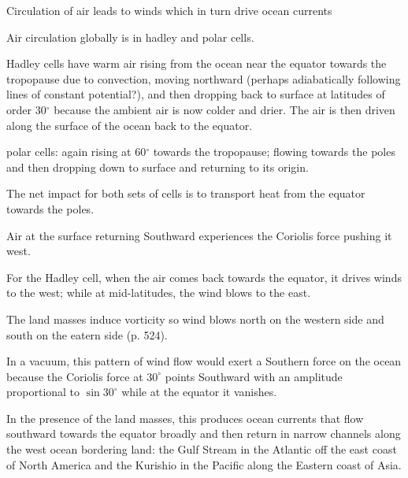 \documentclass[11pt]{book}
\begin{document}
\bei
\item Circulation of air leads to winds which in turn drive ocean currents
\item Air circulation globally is in hadley and polar cells. 
\item Hadley cells have warm air rising from the ocean near the equator towards the tropopause due to convection, moving northward (perhaps adiabatically following lines of constant potential?), and then dropping back to surface at latitudes of order 30$^\circ$ because the ambient air is now colder and drier. 
The air is then driven along the surface of the ocean back to the equator.
\item polar cells: again rising at 60$^\circ$ towards the tropopause; flowing towards the poles and then dropping down to surface and returning to its origin.
\item The net impact for both sets of cells is to transport heat from the equator towards the poles.
\item Air at the surface returning Southward experiences the Coriolis force pushing it west.
\item For the Hadley cell, when the air comes back towards the equator, it drives winds to the west; while at mid-latitudes, the wind blows to the east.
\item The land masses induce vorticity so wind blows north on the western side and south on the eatern side (p. 524). 
\item In a vacuum, this pattern of wind flow would exert a Southern force on the ocean because the Coriolis force at $30^\circ$ points Southward with an amplitude proportional to $\sin 30^\circ$ while at the equator it vanishes. 
\item In the presence of the land masses, this produces ocean currents that flow southward towards the equator broadly and then return in narrow channels along the west ocean bordering land: the Gulf Stream in the Atlantic off the east coast of North America and the Kurishio in the Pacific along the Eastern coast of Asia.
\eei





\end{document}
